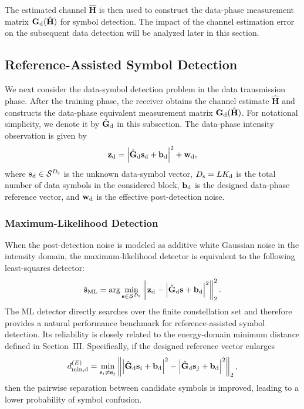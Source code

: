 \documentclass[journal]{IEEEtran}
\begin{document}
The estimated channel $\hat{\mathbf{H}}$ is then used to construct the data-phase measurement matrix $\mathbf{G}_{\rm d}(\hat{\mathbf{H}})$ for symbol detection. 
The impact of the channel estimation error on the subsequent data detection will be analyzed later in this section.

\subsection{Reference-Assisted Symbol Detection}

We next consider the data-symbol detection problem in the data transmission phase. 
After the training phase, the receiver obtains the channel estimate $\hat{\mathbf{H}}$ and constructs the data-phase equivalent measurement matrix $\mathbf{G}_{\rm d}(\hat{\mathbf{H}})$. 
For notational simplicity, we denote it by $\hat{\mathbf{G}}_{\rm d}$ in this subsection. 
The data-phase intensity observation is given by
\begin{equation}
\mathbf{z}_{\rm d}
=
\left|
\hat{\mathbf{G}}_{\rm d}\mathbf{s}_{\rm d}
+
\mathbf{b}_{\rm d}
\right|^2
+
\mathbf{w}_{\rm d},
\label{eq:symbol_detection_model}
\end{equation}
where $\mathbf{s}_{\rm d}\in\mathcal{S}^{D_{\rm s}}$ is the unknown data-symbol vector, $D_{\rm s}=LK_{\rm d}$ is the total number of data symbols in the considered block, $\mathbf{b}_{\rm d}$ is the designed data-phase reference vector, and $\mathbf{w}_{\rm d}$ is the effective post-detection noise.

\subsubsection{Maximum-Likelihood Detection}

When the post-detection noise is modeled as additive white Gaussian noise in the intensity domain, the maximum-likelihood detector is equivalent to the following least-squares detector:
\begin{equation}
\hat{\mathbf{s}}_{\rm ML}
=
\arg\min_{\mathbf{s}\in\mathcal{S}^{D_{\rm s}}}
\left\|
\mathbf{z}_{\rm d}
-
\left|
\hat{\mathbf{G}}_{\rm d}\mathbf{s}
+
\mathbf{b}_{\rm d}
\right|^2
\right\|_2^2.
\label{eq:ml_symbol_detector}
\end{equation}
The ML detector directly searches over the finite constellation set and therefore provides a natural performance benchmark for reference-assisted symbol detection. 
Its reliability is closely related to the energy-domain minimum distance defined in Section~III. 
Specifically, if the designed reference vector enlarges
\begin{equation}
d_{\min,{\rm d}}^{(E)}
=
\min_{\mathbf{s}_i\neq\mathbf{s}_j}
\left\|
\left|
\hat{\mathbf{G}}_{\rm d}\mathbf{s}_i+
\mathbf{b}_{\rm d}
\right|^2
-
\left|
\hat{\mathbf{G}}_{\rm d}\mathbf{s}_j+
\mathbf{b}_{\rm d}
\right|^2
\right\|_2,
\end{equation}
then the pairwise separation between candidate symbols is improved, leading to a lower probability of symbol confusion.
\end{document}
